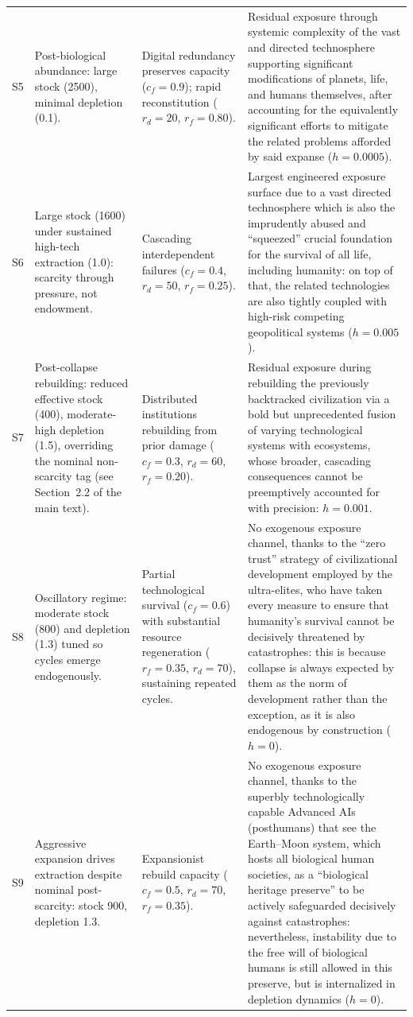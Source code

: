 \documentclass[11pt]{article}
\begin{document}
{\begin{longtable}{l >{\raggedright\arraybackslash}p{3.6cm} >{\raggedright\arraybackslash}p{4.2cm} >{\raggedright\arraybackslash}p{6.2cm}}
S5 & Post-biological abundance: large stock (2500), minimal depletion (0.1). & Digital redundancy preserves capacity ($c_f{=}0.9$); rapid reconstitution ($r_d{=}20$, $r_f{=}0.80$). & Residual exposure through systemic complexity of the vast and directed technosphere supporting significant modifications of planets, life, and humans themselves, after accounting for the equivalently significant efforts to mitigate the related problems afforded by said expanse ($h{=}0.0005$). \\
S6 & Large stock (1600) under sustained high-tech extraction (1.0): scarcity through pressure, not endowment. & Cascading interdependent failures ($c_f{=}0.4$, $r_d{=}50$, $r_f{=}0.25$). & Largest engineered exposure surface due to a vast directed technosphere which is also the imprudently abused and ``squeezed'' crucial foundation for the survival of all life, including humanity: on top of that, the related technologies are also tightly coupled with high-risk competing geopolitical systems ($h{=}0.005$). \\
S7 & Post-collapse rebuilding: reduced effective stock (400), moderate-high depletion (1.5), overriding the nominal non-scarcity tag (see Section~2.2 of the main text). & Distributed institutions rebuilding from prior damage ($c_f{=}0.3$, $r_d{=}60$, $r_f{=}0.20$). & Residual exposure during rebuilding the previously backtracked civilization via a bold but unprecedented fusion of varying technological systems with ecosystems, whose broader, cascading consequences cannot be preemptively accounted for with precision: $h{=}0.001$. \\
S8 & Oscillatory regime: moderate stock (800) and depletion (1.3) tuned so cycles emerge endogenously. & Partial technological survival ($c_f{=}0.6$) with substantial resource regeneration ($r_f{=}0.35$, $r_d{=}70$), sustaining repeated cycles. & No exogenous exposure channel, thanks to the ``zero trust'' strategy of civilizational development employed by the ultra-elites, who have taken every measure to ensure that humanity's survival cannot be decisively threatened by catastrophes: this is because collapse is always expected by them as the norm of development rather than the exception, as it is also endogenous by construction ($h{=}0$). \\
S9 & Aggressive expansion drives extraction despite nominal post-scarcity: stock 900, depletion 1.3. & Expansionist rebuild capacity ($c_f{=}0.5$, $r_d{=}70$, $r_f{=}0.35$). & No exogenous exposure channel, thanks to the superbly technologically capable Advanced AIs (posthumans) that see the Earth--Moon system, which hosts all biological human societies, as a ``biological heritage preserve'' to be actively safeguarded decisively against catastrophes: nevertheless, instability due to the free will of biological humans is still allowed in this preserve, but is internalized in depletion dynamics ($h{=}0$). \\

\end{longtable}}
\end{document}
